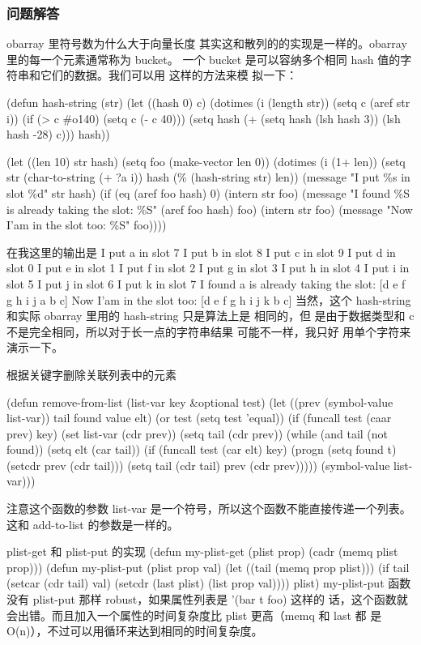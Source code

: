 \documentclass[11pt]{ctexart}
\begin{document}
\subsubsection{问题解答}
\label{sec:org276bc18}
obarray 里符号数为什么大于向量长度
其实这和散列的的实现是一样的。obarray 里的每一个元素通常称为 bucket。 一个
bucket 是可以容纳多个相同 hash 值的字符串和它们的数据。我们可以用 这样的方法来模
拟一下：
\begin{SCR}
(defun hash-string (str)
(let ((hash 0) c)
(dotimes (i (length str))
(setq c (aref str i))
(if (> c \#o140)
(setq c (- c 40)))
(setq hash (+ (setq hash (lsh hash 3))
(lsh hash -28)
c)))
hash))

(let ((len 10) str hash)
(setq foo (make-vector len 0))
(dotimes (i (1+ len))
(setq str (char-to-string (+ ?a i))
hash (\% (hash-string str) len))
(message "I put \%s in slot \%d"
str hash)
(if (eq (aref foo hash) 0)
(intern str foo)
(message "I found \%S is already taking the slot: \%S"
(aref foo hash) foo)
(intern str foo)
(message "Now I'am in the slot too: \%S" foo))))
\end{SCR}

在我这里的输出是
I put a in slot 7
I put b in slot 8
I put c in slot 9
I put d in slot 0
I put e in slot 1
I put f in slot 2
I put g in slot 3
I put h in slot 4
I put i in slot 5
I put j in slot 6
I put k in slot 7
I found a is already taking the slot: [d e f g h i j a b c]
Now I'am in the slot too: [d e f g h i j k b c]
当然，这个 hash-string 和实际 obarray 里用的 hash-string 只是算法上是 相同的，但
是由于数据类型和 c 不是完全相同，所以对于长一点的字符串结果 可能不一样，我只好
用单个字符来演示一下。

根据关键字删除关联列表中的元素
\begin{SCR}
(defun remove-from-list (list-var key \&optional test)
(let ((prev (symbol-value list-var))
tail found value elt)
(or test (setq test 'equal))
(if (funcall test (caar prev) key)
(set list-var (cdr prev))
(setq tail (cdr prev))
(while (and tail (not found))
(setq elt (car tail))
(if (funcall test (car elt) key)
(progn
(setq found t)
(setcdr prev (cdr tail)))
(setq tail (cdr tail)
prev (cdr prev)))))
(symbol-value list-var)))
\end{SCR}
注意这个函数的参数 list-var 是一个符号，所以这个函数不能直接传递一个列表。这和
add-to-list 的参数是一样的。

plist-get 和 plist-put 的实现
(defun my-plist-get (plist prop)
(cadr (memq plist prop)))
(defun my-plist-put (plist prop val)
(let ((tail (memq prop plist)))
(if tail
(setcar (cdr tail) val)
(setcdr (last plist) (list prop val))))
plist)
my-plist-put 函数没有 plist-put 那样 robust，如果属性列表是 '(bar t foo) 这样的
话，这个函数就会出错。而且加入一个属性的时间复杂度比 plist 更高（memq 和 last 都
是 O(n)），不过可以用循环来达到相同的时间复杂度。
\end{document}
